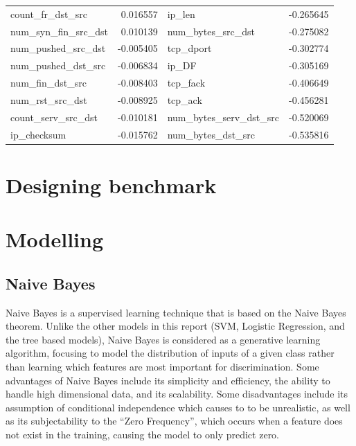 \begin{table}[!htb]
\begin{tabular}{lrlr}
count\_fr\_dst\_src&         0.016557 & ip\_len&                  -0.265645\\
num\_syn\_fin\_src\_dst&      0.010139 & num\_bytes\_src\_dst&       -0.275082\\
num\_pushed\_src\_dst&      -0.005405 & tcp\_dport&               -0.302774\\
num\_pushed\_dst\_src&      -0.006834 & ip\_DF&                   -0.305169\\
num\_fin\_dst\_src&         -0.008403 & tcp\_fack&                -0.406649\\
num\_rst\_src\_dst&         -0.008925 & tcp\_ack&                 -0.456281\\
count\_serv\_src\_dst&      -0.010181 & num\_bytes\_serv\_dst\_src&  -0.520069\\
ip\_checksum&             -0.015762 & num\_bytes\_dst\_src&       -0.535816\\
\bottomrule
    \end{tabular}
\end{table}





\section{Designing benchmark}


\section{Modelling}
\subsection{Naive Bayes}
Naive Bayes is a supervised learning technique that is based on the Naive Bayes theorem. Unlike the other models in this report (SVM, Logistic Regression, and the tree based models), Naive Bayes is considered as a generative learning algorithm, focusing to model the distribution of inputs of a given class rather than learning which features are most important for discrimination. Some advantages of Naive Bayes include its simplicity and efficiency, the ability to handle high dimensional data, and its scalability. Some disadvantages include its assumption of conditional independence which causes to to be unrealistic, as well as its subjectability to the ``Zero Frequency'', which occurs when a feature does not exist in the training, causing the model to only predict zero.

